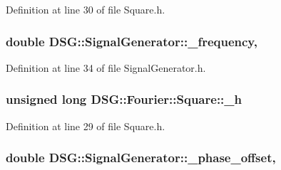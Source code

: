 Definition at line 30 of file Square.\-h.

\hypertarget{classDSG_1_1SignalGenerator_a67e296e3506dcdf09402c667cddff9ac}{
\subsubsection[{\-\_\-frequency}]{\setlength{\rightskip}{0pt plus 5cm}double D\-S\-G\-::\-Signal\-Generator\-::\-\_\-frequency\hspace{0.3cm}{\ttfamily [protected]}, {\ttfamily [inherited]}}}\label{classDSG_1_1SignalGenerator_a67e296e3506dcdf09402c667cddff9ac}


Definition at line 34 of file Signal\-Generator.\-h.

\hypertarget{classDSG_1_1Fourier_1_1Square_a8d7bdc95bfdfc37d624ea80bbcf9b5b2}{
\subsubsection[{\-\_\-h}]{\setlength{\rightskip}{0pt plus 5cm}unsigned long D\-S\-G\-::\-Fourier\-::\-Square\-::\-\_\-h\hspace{0.3cm}{\ttfamily [protected]}}}\label{classDSG_1_1Fourier_1_1Square_a8d7bdc95bfdfc37d624ea80bbcf9b5b2}


Definition at line 29 of file Square.\-h.

\hypertarget{classDSG_1_1SignalGenerator_a9abf9d00c798e0fdca6314f17547758a}{
\subsubsection[{\-\_\-phase\-\_\-offset}]{\setlength{\rightskip}{0pt plus 5cm}double D\-S\-G\-::\-Signal\-Generator\-::\-\_\-phase\-\_\-offset\hspace{0.3cm}{\ttfamily [protected]}, {\ttfamily [inherited]}}}\label{classDSG_1_1SignalGenerator_a9abf9d00c798e0fdca6314f17547758a}


